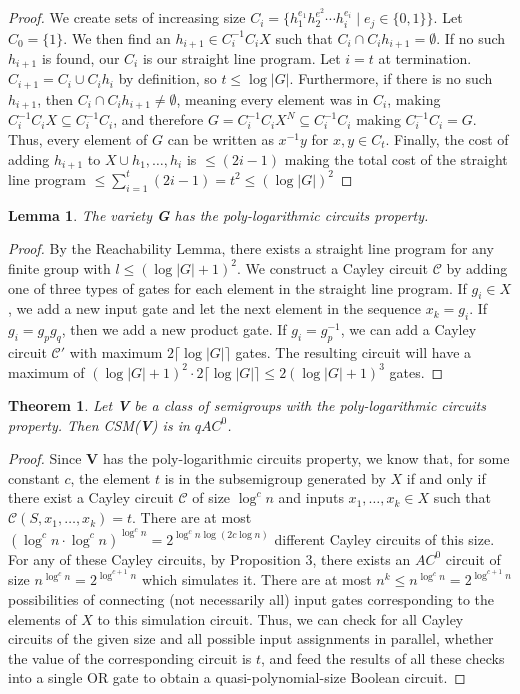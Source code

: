 \documentclass[a4paper,12pt]{article}
\theoremstyle{plain}
\newtheorem{theorem}{Theorem}
\newtheorem{lemma}{Lemma}
\theoremstyle{definition}
\theoremstyle{remark}
\begin{document}
\begin{proof}
  We create sets of increasing size $C_i=\{h_1^{e_1}h_2^{e^2}\cdots h_i^{e_i}\mid e_j\in\{0,1\}\}$. Let $C_0=\{1\}$. We then find an $h_{i+1}\in C_i^{-1}C_iX$ such that $C_i\cap C_ih_{i+1}=\emptyset$. If no such $h_{i+1}$ is found, our $C_i$ is our straight line program. Let $i=t$ at termination. $C_{i+1}=C_i\cup C_ih_i$ by definition, so $t\leq\log|G|$. Furthermore, if there is no such $h_{i+1}$, then $C_i\cap C_ih_{i+1}\neq\emptyset$, meaning every element was in $C_i$, making $C_i^{-1}C_iX\subseteq C_i^{-1}C_i$, and therefore $G=C_i^{-1}C_iX^N\subseteq C_i^{-1}C_i$ making $C_i^{-1}C_i=G$. Thus, every element of $G$ can be written as $x^{-1}y$ for $x,y\in C_t$. Finally, the cost of adding $h_{i+1}$ to $X\cup{h_1,\dots, h_i}$ is $\leq(2i-1)$ making the total cost of the straight line program $\leq\sum_{i=1}^t(2i-1)=t^2\leq(\log|G|)^2$
\end{proof}
\begin{lemma}
  The \textit{variety} \textbf{G} has the poly-logarithmic circuits property.
\end{lemma}
\begin{proof}
  By the Reachability Lemma, there exists a straight line program for any finite group with $l\leq(\log|G|+1)^2$. We construct a Cayley circuit $\mathcal{C}$ by adding one of three types of gates for each element in the straight line program. If $g_i\in X$, we add a new input gate and let the next element in the sequence $x_k=g_i$. If $g_i=g_pg_q$, then we add a new product gate. If $g_i=g_p^{-1}$, we can add a Cayley circuit $\mathcal{C}'$ with maximum $2\lceil\log|G|\rceil$ gates. The resulting circuit will have a maximum of $(\log|G|+1)^2\cdot2\lceil\log|G|\rceil\leq2(\log|G|+1)^3$ gates.
\end{proof}
\begin{theorem}
  Let \textbf{V} be a class of semigroups with the poly-logarithmic circuits property. Then CSM(\textbf{V}) is in $qAC^0$.
\end{theorem}
\begin{proof}
  Since \textbf{V} has the poly-logarithmic circuits property, we know that, for some constant $c$, the element $t$ is in the subsemigroup generated by $X$ if and only if there exist a Cayley circuit $\mathcal{C}$ of size $\log^cn$ and inputs $x_1,\dots,x_k\in X$ such that $\mathcal{C}(S,x_1,\dots,x_k)=t$. There are at most $(\log^cn\cdot\log^cn)^{\log^cn}=2^{\log^cn\log(2c\log n)}$ different Cayley circuits of this size.
  For any of these Cayley circuits, by Proposition 3, there exists an $AC^0$ circuit of size $n^{\log^cn} = 2^{\log^{c+1}n}$ which simulates it. There are at most $n^k\leq n^{\log^cn}=2^{\log^{c+1}n}$ possibilities of connecting (not necessarily all) input gates corresponding to the elements of $X$ to this simulation circuit. Thus, we can check for all Cayley circuits of the given size and all possible input assignments in parallel, whether the value of the corresponding circuit is $t$, and feed the results of all these checks into a single OR gate to obtain a quasi-polynomial-size Boolean circuit.
\end{proof}
\end{document}
